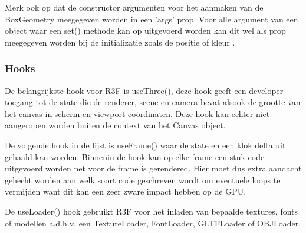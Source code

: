 Merk ook op dat de constructor argumenten voor het aanmaken van de BoxGeometry meegegeven worden in een 'args' prop. Voor alle argument van een object waar een set() methode kan op uitgevoerd worden kan dit wel als prop meegegeven worden bij de initializatie zoals de positie of kleur \autocite{reactThreeFiber2023}.

\subsubsection{Hooks}

De belangrijkste hook voor R3F is useThree(), deze hook geeft een developer toegang tot de state die de renderer, scene en camera bevat alsook de grootte van het canvas in scherm en viewport coördinaten. Deze hook kan echter niet aangeropen worden buiten de context van het Canvas object.

De volgende hook in de lijst is useFrame() waar de state en een klok delta uit gehaald kan worden. Binnenin de hook kan op elke frame een stuk code uitgevoerd worden net voor de frame is gerendered. Hier moet dus extra aandacht gehecht worden aan welk soort code geschreven wordt om eventuele loops te vermijden want dit kan een zeer zware impact hebben op de GPU.

De useLoader() hook gebruikt R3F voor het inladen van bepaalde textures, fonts of modellen a.d.h.v. een TextureLoader, FontLoader, GLTFLoader of OBJLoader.
